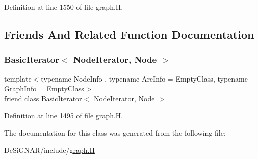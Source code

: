 Definition at line 1550 of file graph.\+H.



\subsection{Friends And Related Function Documentation}
\mbox{\label{class_designar_1_1_digraph_1_1_node_iterator_a21dc6ae614d097ff896e9e8e422d8f3c}} 
\subsubsection{\texorpdfstring{Basic\+Iterator$<$ Node\+Iterator, Node $>$}{BasicIterator< NodeIterator, Node >}}
{\footnotesize\ttfamily template$<$typename Node\+Info , typename Arc\+Info  = Empty\+Class, typename Graph\+Info  = Empty\+Class$>$ \\
friend class \hyperlink{class_designar_1_1_basic_iterator}{Basic\+Iterator}$<$ \hyperlink{class_designar_1_1_digraph_1_1_node_iterator}{Node\+Iterator}, \hyperlink{class_designar_1_1_digraph_a4dc921c41a480b7946a04170e997d8ae}{Node} $>$\hspace{0.3cm}{\ttfamily [friend]}}



Definition at line 1495 of file graph.\+H.



The documentation for this class was generated from the following file\+:\begin{DoxyCompactItemize}
\item 
De\+Si\+G\+N\+A\+R/include/\hyperlink{graph_8_h}{graph.\+H}\end{DoxyCompactItemize}
